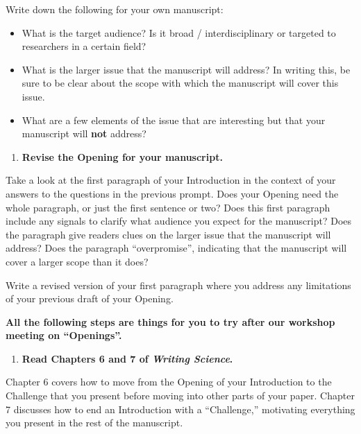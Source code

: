 \documentclass[]{tufte-book}
\providecommand{\tightlist}{%
  \setlength{\itemsep}{0pt}\setlength{\parskip}{0pt}}
\begin{document}
Write down the following for your own manuscript:

\begin{itemize}
\tightlist
\item
  What is the target audience? Is it broad / interdisciplinary or targeted to
  researchers in a certain field?
\item
  What is the larger issue that the manuscript will address? In writing this, be
  sure to be clear about the scope with which the manuscript will cover this
  issue.
\item
  What are a few elements of the issue that are interesting but that your
  manuscript will \textbf{not} address?
\end{itemize}

\begin{enumerate}
\def\labelenumi{\arabic{enumi}.}
\setcounter{enumi}{6}
\tightlist
\item
  \textbf{Revise the Opening for your manuscript.}
\end{enumerate}

Take a look at the first paragraph of your Introduction in the context of your
answers to the questions in the previous prompt. Does your Opening need the
whole paragraph, or just the first sentence or two? Does this first paragraph
include any signals to clarify what audience you expect for the manuscript? Does
the paragraph give readers clues on the larger issue that the manuscript will
address? Does the paragraph ``overpromise'', indicating that the manuscript will
cover a larger scope than it does?

Write a revised version of your first paragraph where you address any
limitations of your previous draft of your Opening.

\textbf{All the following steps are things for you to try after our workshop
meeting on ``Openings''.}

\begin{enumerate}
\def\labelenumi{\arabic{enumi}.}
\setcounter{enumi}{7}
\tightlist
\item
  \textbf{Read Chapters 6 and 7 of \emph{Writing Science}.}
\end{enumerate}

Chapter 6 covers how to move from the Opening of your Introduction to the
Challenge that you present before moving into other parts of your paper. Chapter
7 discusses how to end an Introduction with a ``Challenge,'' motivating everything
you present in the rest of the manuscript.
\end{document}
